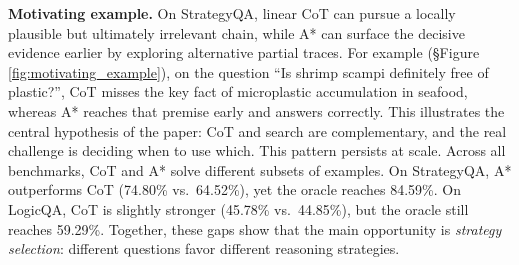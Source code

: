 \documentclass[11pt]{article}
\begin{document}

\textbf{Motivating example.} On StrategyQA, linear CoT can pursue a locally plausible but ultimately irrelevant chain, while A* can surface the decisive evidence earlier by exploring alternative partial traces. For example (\S Figure \ref{fig:motivating_example}), on the question ``Is shrimp scampi definitely free of plastic?'', CoT misses the key fact of microplastic accumulation in seafood, whereas A* reaches that premise early and answers correctly. This illustrates the central hypothesis of the paper: CoT and search are complementary, and the real challenge is deciding when to use which. This pattern persists at scale. Across all benchmarks, CoT and A* solve different subsets of examples. On StrategyQA, A* outperforms CoT (74.80\% vs.\ 64.52\%), yet the oracle reaches 84.59\%. On LogicQA, CoT is slightly stronger (45.78\% vs.\ 44.85\%), but the oracle still reaches 59.29\%. Together, these gaps show that the main opportunity is \emph{strategy selection}: different questions favor different reasoning strategies.


\end{document}
